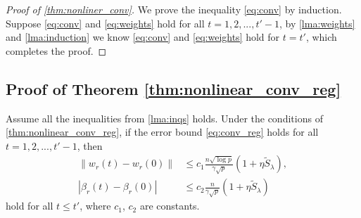 \begin{proof}[Proof of \cref{thm:nonliner_conv}]
We prove the inequality \eqref{eq:conv} by induction. Suppose \eqref{eq:conv} and \eqref{eq:weights} hold for all $t=1,2,...,t'-1$, by \cref{lma:weights} and \cref{lma:induction} we know \eqref{eq:conv} and \eqref{eq:weights} hold for $t=t'$, which completes the proof.
\end{proof}

\subsection{Proof of Theorem \ref{thm:nonlinear_conv_reg}}

\begin{lemma}
\label{lma:weights_reg}
Assume all the inequalities from \cref{lma:inqs} holds. Under the conditions of \cref{thm:nonlinear_conv_reg}, if the error bound \eqref{eq:conv_reg} holds for all $t=1,2,...,t'-1$, then
\begin{equation}
\label{eq:weights_reg}
\begin{aligned}
    \|w_r(t)-w_r(0)\| &\leq c_1\frac{n\sqrt{\log p}}{\gamma\sqrt p}(1+\eta \tilde{S}_\lambda),\\
    |\beta_r(t)-\beta_r(0)| &\leq c_2\frac{n}{\gamma\sqrt p}(1+\eta \tilde{S}_\lambda)
\end{aligned}
\end{equation}
hold for all $t\leq t'$, where $c_1$, $c_2$ are constants.
\end{lemma}

